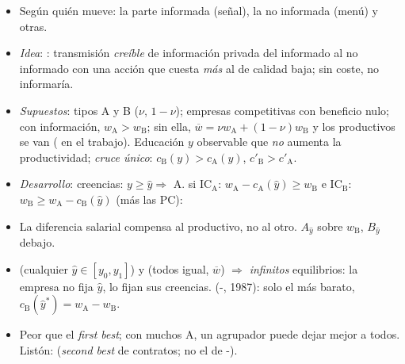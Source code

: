 \documentclass{article}
\begin{document}
\begin{columnas}
\begin{itemize}
\item Según quién mueve: la parte informada (señal), la no informada (menú) y otras.
\end{itemize}
\begin{itemize}
\item \emph{Idea}: : transmisión \emph{creíble} de información privada del informado al no informado con una acción que cuesta \emph{más} al de calidad baja; sin coste, no informaría.
\item \emph{Supuestos}: tipos A y B ($\nu$, $1-\nu$); empresas competitivas con beneficio nulo; con información, $w_{\mathrm{A}}>w_{\mathrm{B}}$; sin ella, $\overline{w}=\nu w_{\mathrm{A}}+(1-\nu)w_{\mathrm{B}}$ y los productivos se van ( en el trabajo). Educación $y$ observable que \emph{no} aumenta la productividad; \emph{cruce único}: $c_{\mathrm{B}}(y)>c_{\mathrm{A}}(y)$, $c'_{\mathrm{B}}>c'_{\mathrm{A}}$.
\item \emph{Desarrollo}: creencias: $y\geq\hat y\Rightarrow$ A.  si $\mathrm{IC}_{\mathrm{A}}$: $w_{\mathrm{A}}-c_{\mathrm{A}}(\hat y)\geq w_{\mathrm{B}}$ e $\mathrm{IC}_{\mathrm{B}}$: $w_{\mathrm{B}}\geq w_{\mathrm{A}}-c_{\mathrm{B}}(\hat y)$ (más las PC):
\item[] La diferencia salarial compensa al productivo, no al otro. $A_{\hat y}$ sobre $w_{\mathrm{B}}$, $B_{\hat y}$ debajo.
\end{itemize}
\begin{itemize}
\item {} (cualquier $\hat y\in[y_0,y_1]$) y  (todos igual, $\overline{w}$) $\Rightarrow$ \emph{infinitos} equilibrios: la empresa no fija $\hat y$, lo fijan sus creencias.  (-, 1987): solo el más barato, $c_{\mathrm{B}}(\hat y^*)=w_{\mathrm{A}}-w_{\mathrm{B}}$.
\item Peor que el \emph{first best}; con muchos A, un agrupador puede dejar mejor a todos. Listón:  (\emph{second best} de contratos; no el de -).

\end{itemize}
\end{columnas}
\end{document}
